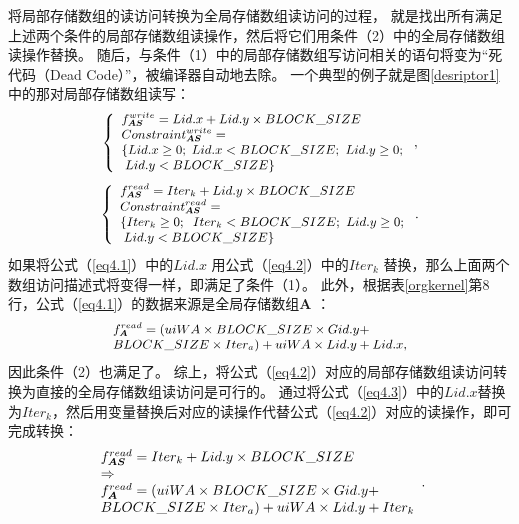 将局部存储数组的读访问转换为全局存储数组读访问的过程，
就是找出所有满足上述两个条件的局部存储数组读操作，然后将它们用条件（2）中的全局存储数组读操作替换。
随后，与条件（1）中的局部存储数组写访问相关的语句将变为``死代码（Dead Code）''，被编译器自动地去除。
一个典型的例子就是图\ref{desriptor1}中的那对局部存储数组读写：
\begin{equation}
\small
\left\{ \begin{array}{l}
f_{\bm{AS}}^{write}=Lid.x + Lid.y \times BLOCK\_SIZE\\
Constraint_{\bm{AS}}^{write}=\\ \{ Lid.x \ge 0;\;Lid.x < BLOCK\_SIZE;\ Lid.y \ge 0;
\\ \;Lid.y < BLOCK\_SIZE\} 
\end{array} \right.,
\label{eq4.1}
\end{equation}
\begin{equation}
\small
\left\{ \begin{array}{l}
f_{\bm{AS}}^{read} = Ite{r_k} + Lid.y \times BLOCK\_SIZE\\
Constraint_{\bm{AS}}^{read} = \\
\{ Ite{r_k} \ge 0;\;\;Ite{r_k} < BLOCK\_SIZE;\ Lid.y \ge 0;\\ \;Lid.y < BLOCK\_SIZE\} 
\end{array} \right..
\label{eq4.2}
\end{equation}
如果将公式（\ref{eq4.1}）中的$Lid.x$ 用公式（\ref{eq4.2}）中的$Iter_k$ 替换，那么上面两个数组访问描述式将变得一样，即满足了条件（1）。
此外，根据表\ref{orgkernel}第8行，公式（\ref{eq4.1}）的数据来源是全局存储数组$\bm{A}$ ：
\begin{equation}
\small
\begin{array}{l}
f_{\bm{A}}^{read} = (uiWA \times BLOCK\_SIZE \times Gid.y + \\ BLOCK\_SIZE \times Ite{r_a})
 + uiWA \times Lid.y + Lid.x,
\end{array}
\label{eq4.3}
\end{equation}
因此条件（2）也满足了。
综上，将公式（\ref{eq4.2}）对应的局部存储数组读访问转换为直接的全局存储数组读访问是可行的。
通过将公式（\ref{eq4.3}）中的$Lid.x$替换为$Iter_k$，然后用变量替换后对应的读操作代替公式（\ref{eq4.2}）对应的读操作，即可完成转换：
\begin{equation}
\begin{array}{l}
\small
f_{\bm{AS}}^{read} = Ite{r_k} + Lid.y \times BLOCK\_SIZE\\
 \Rightarrow \\
f_{\bm{A}}^{read} = (uiWA \times BLOCK\_SIZE \times Gid.y +\\ BLOCK\_SIZE \times Ite{r_a})
 + uiWA \times Lid.y + Ite{r_k}
\end{array}.
\end{equation}

